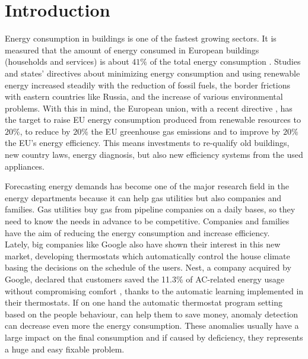 \documentclass{sig-alternate-sigmod07}
\begin{document}

\section{Introduction}

Energy consumption in buildings is one of the fastest growing sectors. It is measured that the amount of energy consumed in European buildings (households and services) is about $41\%$ of the total energy consumption \cite{Eurostat2013}. Studies and states' directives about minimizing energy consumption and using renewable energy increased steadily with the reduction of fossil fuels, the border frictions with eastern countries like Russia, and the increase of various environmental problems. With this in mind, the European union, with a recent directive \cite{Directive2009}, has the target to raise EU energy consumption produced from renewable resources to $20\%$, to reduce by $20\%$ the EU greenhouse gas emissions and to improve by $20\%$ the EU's energy efficiency. This means investments to re-qualify old buildings, new country laws, energy diagnosis, but also new efficiency systems from the used appliances.

Forecasting energy demands has become one of the major research field in the energy departments because it can help gas utilities but also companies and families. Gas utilities buy gas from pipeline companies on a daily bases, so they need to know the needs in advance to be competitive.  Companies and families have the aim of reducing the energy consumption and increase efficiency. \\
Lately, big companies like Google also have shown their interest in this new market, developing thermostats which automatically control the house climate basing the decisions on the schedule of the users. Nest, a company acquired by Google, declared that customers saved the 11.3\% of AC-related energy usage without compromising comfort \cite{GoogleNest2}, thanks to the automatic learning implemented in their thermostats. If on one hand the automatic thermostat program setting based on the people behaviour, can help them to save money, anomaly detection can decrease even more the energy consumption. These anomalies usually have a large impact on the final consumption and if caused by deficiency, they represents a huge and easy fixable problem. 
\end{document}
